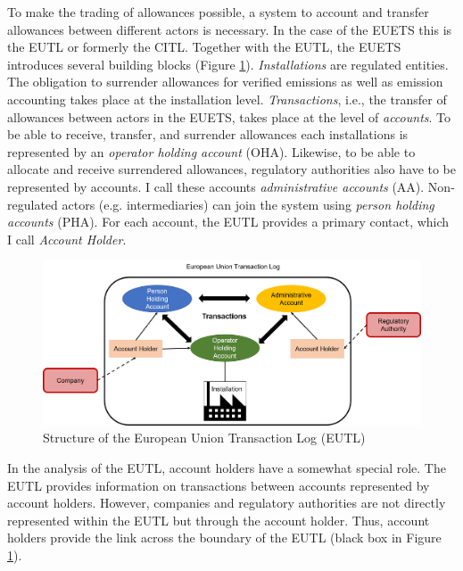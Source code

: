 \documentclass[authoryear]{elsarticle}
\begin{document}
To make the trading of allowances possible, a system to account and transfer allowances between different actors is necessary. In the case of the EUETS this is the EUTL or formerly the CITL. Together with the EUTL, the EUETS introduces several building blocks (Figure \ref{fig:eutl_strucutre}). \emph{Installations} are regulated entities. The obligation to surrender allowances for verified emissions as well as emission accounting takes place at the installation level. \textit{Transactions}, i.e., the transfer of allowances between actors in the EUETS, takes place at the level of \textit{accounts}. To be able to receive, transfer, and surrender allowances each installations is represented by an \textit{operator holding account} (OHA). Likewise, to be able to allocate and receive surrendered allowances, regulatory authorities also have to be represented by accounts. I call these accounts \textit{administrative accounts} (AA). Non-regulated actors (e.g. intermediaries) can join the system using \textit{person holding accounts} (PHA). For each account, the EUTL provides a primary contact, which I call \textit{Account Holder}.

\begin{figure}[!htbp]
	\caption{Structure of the European Union Transaction Log (EUTL)}\label{fig:eutl_strucutre}
	\centering
	\vspace{-2ex}
	\includegraphics[width=\textwidth]{figures/eutl_structure.png}
\end{figure}

In the analysis of the EUTL, account holders have a somewhat special role. The EUTL provides information on transactions between accounts represented by account holders. However, companies and regulatory authorities are not directly represented within the EUTL but through the account holder. Thus, account holders provide the link across the boundary of the EUTL (black box in Figure \ref{fig:eutl_strucutre}). 
\end{document}
